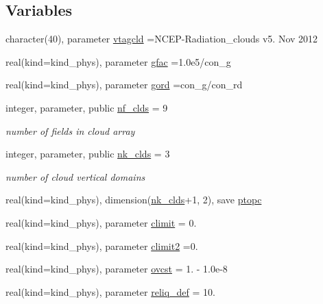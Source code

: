 \subsection*{Variables}
\begin{DoxyCompactItemize}
\item 
character(40), parameter \hyperlink{namespacemodule__radiation__clouds_a54f11c2f6353f244501cf4ec3553d78b}{vtagcld} =\textquotesingle{}N\+C\+EP-\/Radiation\+\_\+clouds v5. Nov 2012 \textquotesingle{}
\item 
real(kind=kind\+\_\+phys), parameter \hyperlink{namespacemodule__radiation__clouds_ab4060544be25be2b0a87042fb3bd6242}{gfac} =1.\+0e5/con\+\_\+g
\item 
real(kind=kind\+\_\+phys), parameter \hyperlink{namespacemodule__radiation__clouds_a50ea21222eb91e6363e8bf1338b34a66}{gord} =con\+\_\+g/con\+\_\+rd
\item 
integer, parameter, public \hyperlink{namespacemodule__radiation__clouds_a66cf0f94619a3d865b0c593197a30576}{nf\+\_\+clds} = 9
\begin{DoxyCompactList}\small\item\em number of fields in cloud array \end{DoxyCompactList}\item 
integer, parameter, public \hyperlink{namespacemodule__radiation__clouds_a2739168b8205ee860eb8a160ea722a44}{nk\+\_\+clds} = 3
\begin{DoxyCompactList}\small\item\em number of cloud vertical domains \end{DoxyCompactList}\item 
real(kind=kind\+\_\+phys), dimension(\hyperlink{namespacemodule__radiation__clouds_a2739168b8205ee860eb8a160ea722a44}{nk\+\_\+clds}+1, 2), save \hyperlink{namespacemodule__radiation__clouds_a03bc5d19cbdc84a2032c8d591ba4c96a}{ptopc}
\item 
real(kind=kind\+\_\+phys), parameter \hyperlink{namespacemodule__radiation__clouds_ad4d5840310847f5bf39082114069ceb8}{climit} = 0.
\item 
real(kind=kind\+\_\+phys), parameter \hyperlink{namespacemodule__radiation__clouds_a2f6f333d39f496f623036802fc05f209}{climit2} =0.
\item 
real(kind=kind\+\_\+phys), parameter \hyperlink{namespacemodule__radiation__clouds_a5667082e13ef37593bdfcc152e3dd449}{ovcst} = 1. -\/ 1.\+0e-\/8
\item 
real(kind=kind\+\_\+phys), parameter \hyperlink{namespacemodule__radiation__clouds_a1768a85f4d8af2ad40b62ae6e6667c1e}{reliq\+\_\+def} = 10.

\end{DoxyCompactItemize}
